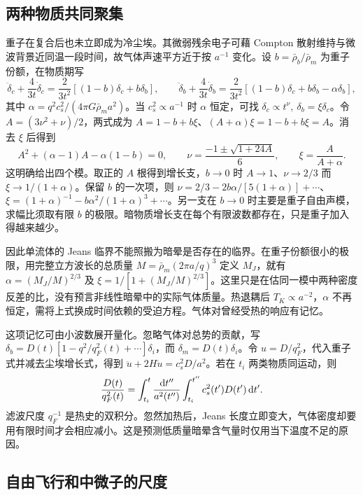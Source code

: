 \subsection{两种物质共同聚集}

重子在复合后也未立即成为冷尘埃。其微弱残余电子可藉 Compton 散射维持与微波背景近同温一段时间，故气体声速平方近于按 $a^{-1}$ 变化。设 $b=\bar\rho_b/\bar\rho_m$ 为重子份额，在物质期写
\[
 \ddot\delta_c+\frac4{3t}\dot\delta_c
 =\frac2{3t^2}[(1-b)\delta_c+b\delta_b],\qquad
 \ddot\delta_b+\frac4{3t}\dot\delta_b
 =\frac2{3t^2}[(1-b)\delta_c+b\delta_b-\alpha\delta_b],
\]
其中 $\alpha=q^2c_s^2/(4\pi G\bar\rho_m a^2)$。当 $c_s^2\propto a^{-1}$ 时 $\alpha$ 恒定，可找 $\delta_c\propto t^\nu,\ \delta_b=\xi\delta_c$。令 $A=(3\nu^2+\nu)/2$，两式成为 $A=1-b+b\xi$、$(A+\alpha)\xi=1-b+b\xi=A$。消去 $\xi$ 后得到
\begin{equation}\label{eq:cosmo-baryon-four}
 A^2+(\alpha-1)A-\alpha(1-b)=0,\qquad
 \nu=\frac{-1\pm\sqrt{1+24A}}6,\qquad
 \xi=\frac{A}{A+\alpha}.
\end{equation}
这明确给出四个模。取正的 $A$ 根得到增长支，$b\to0$ 时 $A\to1$、$\nu\to2/3$ 而 $\xi\to1/(1+\alpha)$。保留 $b$ 的一次项，则 $\nu=2/3-2b\alpha/[5(1+\alpha)]+\cdots$、$\xi=(1+\alpha)^{-1}-b\alpha^2/(1+\alpha)^3+\cdots$。另一支在 $b\to0$ 时主要是重子自由声模，求幅比须取有限 $b$ 的极限。暗物质增长支在每个有限波数都存在，只是重子加入得越来越少。

因此单流体的 Jeans 临界不能照搬为暗晕是否存在的临界。在重子份额很小的极限，用完整立方波长的总质量 $M=\bar\rho_m(2\pi a/q)^3$ 定义 $M_J$，就有 $\alpha=(M_J/M)^{2/3}$ 及 $\xi=1/[1+(M_J/M)^{2/3}]$。这里只是在估同一模中两种密度反差的比，没有预言非线性暗晕中的实际气体质量。热退耦后 $T_K\propto a^{-2}$，$\alpha$ 不再恒定，需将上式换成时间依赖的受迫方程。气体对曾经受热的响应有记忆。

这项记忆可由小波数展开量化。忽略气体对总势的贡献，写 $\delta_b=D(t)[1-q^2/q_F^2(t)+\cdots]\delta_i$，而 $\delta_m=D(t)\delta_i$。令 $u=D/q_F^2$，代入重子式并减去尘埃增长式，得到 $\ddot u+2H\dot u=c_s^2D/a^2$。若在 $t_i$ 两类物质同运动，则
\[
 \frac{D(t)}{q_F^2(t)}
  =\int_{t_i}^t\frac{\dd t''}{a^2(t'')}
       \int_{t_i}^{t''}c_s^2(t')D(t')\,\dd t' .
\]
滤波尺度 $q_F^{-1}$ 是热史的双积分。忽然加热后，Jeans 长度立即变大，气体密度却要用有限时间才会相应减小。这是预测低质量暗晕含气量时仅用当下温度不足的原因。

\subsection{自由飞行和中微子的尺度}

